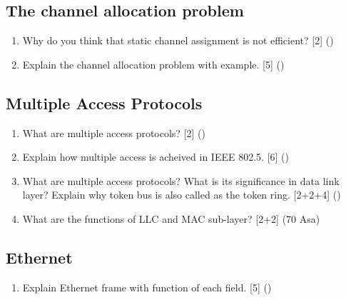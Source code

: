 \documentclass[12pt]{article}
\begin{document}
	\subsection{The channel allocation problem}
		\begin{enumerate}[noitemsep, topsep=0pt]
			\item Why do you think that static channel assignment is not efficient? \hfill [2] () 
			\item Explain the channel allocation problem with example. \hfill[5] ()
		\end{enumerate}

	\subsection{Multiple Access Protocols}
		\begin{enumerate}[noitemsep, topsep=0pt]
			\item What are multiple access protocols? \hfill [2] ()

			\item Explain how multiple access is acheived in IEEE 802.5. \hfill[6] ()

			\item What are multiple access protocols? What is its significance in data link layer? Explain why token bus is also called as the token ring. \hfill [2+2+4] ()

			\item What are the functions of LLC and MAC sub-layer? \hfill [2+2] (70 Asa)
		\end{enumerate}

	\subsection{Ethernet}
		\begin{enumerate}
			\item Explain Ethernet frame with function of each field. \hfill [5] ()
		\end{enumerate}
\end{document}
